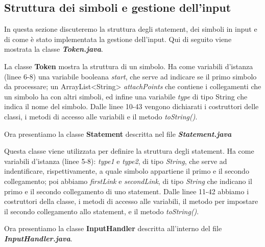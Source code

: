 \subsection{Struttura dei simboli e gestione dell'input}
In questa sezione discuteremo la struttura degli statement, dei simboli in input e di come è stato implementata la gestione dell'input. Qui di seguito viene mostrata la classe \textbf{\textit{Token.java}}.

La classe \textbf{Token} mostra la struttura di un simbolo. Ha come variabili d'istanza (linee 6-8) una variabile booleana \textit{start}, che serve ad indicare se il primo simbolo da processare; un ArrayList<String> \textit{attachPoints} che contiene i collegamenti che un simbolo ha con altri simboli, ed infine una variabile \textit{type} di tipo String che indica il nome del simbolo. Dalle linee 10-43 vengono dichiarati i costruttori delle classi, i metodi di accesso alle variabili e il metodo \textit{toString()}.\par
Ora presentiamo la classe \textbf{Statement} descritta nel file \textbf{\textit{Statement.java}}

Questa classe viene utilizzata per definire la struttura degli statement. Ha come variabili d'istanza (linee 5-8): \textit{type1} e \textit{type2}, di tipo \textit{String}, che serve ad indentificare, rispettivamente, a quale simbolo appartiene il primo e il secondo collegamento; poi abbiamo \textit{firstLink} e \textit{secondLink}, di tipo \textit{String} che indicano il primo e il secondo collegamento di uno statement. Dalle linee 11-42 abbiamo i costruttori della classe, i metodi di accesso alle variabili, il metodo per impostare il secondo collegamento allo statement, e il metodo \textit{toString()}.\par
Ora presentiamo la classe \textbf{InputHandler} descritta all'interno del file \textbf{\textit{InputHandler.java}}.

